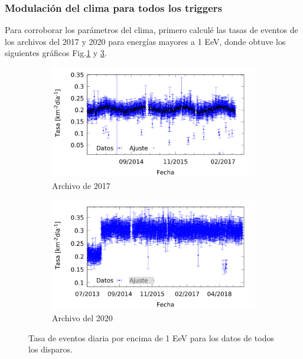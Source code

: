 
      \subsubsection{Modulación del clima para todos los triggers}

      Para corroborar los parámetros del clima, primero calculé las tasas de eventos de los archivos del 2017 y 2020 para energías mayores a 1  EeV, donde obtuve los siguientes gráficos Fig.\ref{fig:rate_daily_2017_1EeV} y \ref{fig:rate_daily_2020_1EeV}. 

        \begin{figure}[H]
        
          \begin{subfigure}[b]{0.5\textwidth}
          \centering
          \includegraphics[width=\textwidth]{../03_IntroduccionReport/daily_rate/daily_rate_AllTriggers_2017_1EeV.png}
          \caption{Archivo de 2017}   \label{fig:rate_daily_2017_1EeV}
          \end{subfigure}%
        \hfill
          \begin{subfigure}[b]{0.5\textwidth}
          \centering
          \includegraphics[width=\textwidth]{../03_IntroduccionReport/daily_rate/daily_rate_AllTriggers_2019_1EeV.png}
          \caption{Archivo del 2020}  \label{fig:rate_daily_2020_1EeV}
          \end{subfigure}
          \caption{Tasa de eventos diaria por encima de 1 EeV para los datos de todos los disparos.}
        \end{figure}

